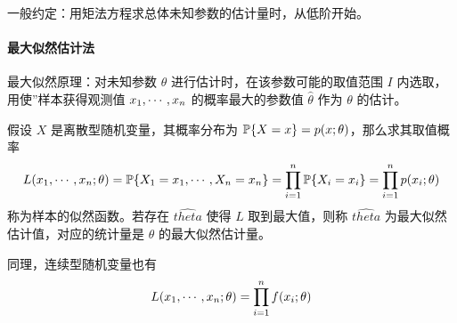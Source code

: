 一般约定：用矩法方程求总体未知参数的估计量时，从低阶开始。

\paragraph{最大似然估计法}

最大似然原理：对未知参数 $\theta$ 进行估计时，在该参数可能的取值范围 $I$ 内选取，用使”样本获得观测值 $x_1,\cdots,x_n$ 的概率最大的参数值 $\hat{\theta}$ 作为 $\theta$ 的估计。

假设 $X$ 是离散型随机变量，其概率分布为 $\mathbb{P}\{X = x\} = p(x; \theta)$，那么求其取值概率
\[ L(x_1,\cdots,x_n;\theta) = \mathbb{P}\{X_1 = x_1, \cdots, X_n = x_n\} = \prod_{i=1}^n \mathbb{P}\{X_i=x_i\} = \prod_{i=1}^n p(x_i; \theta) \]
称为样本的似然函数。若存在 $\hat{theta}$ 使得 $L$ 取到最大值，则称 $\hat{theta}$ 为最大似然估计值，对应的统计量是 $\theta$ 的最大似然估计量。

同理，连续型随机变量也有
\[ L(x_1,\cdots,x_n; \theta) = \prod_{i=1}^n f(x_i; \theta) \]




